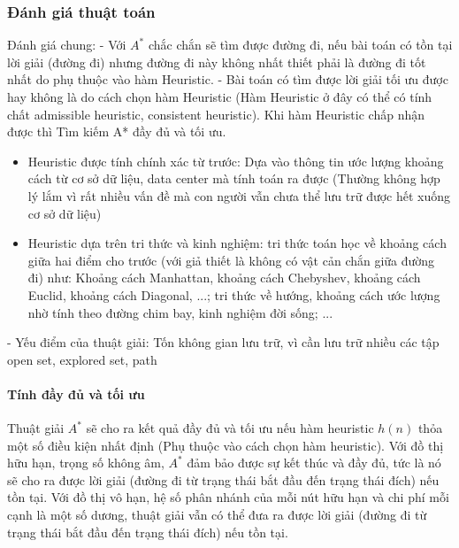 \documentclass{article}
\begin{document}
\subsubsection{Đánh giá thuật toán}
Đánh giá chung:\newline
- Với $A^{*}$ chắc chắn sẽ tìm được đường đi, nếu bài toán có tồn tại lời giải (đường đi) nhưng đường đi này không nhất thiết phải là đường đi tốt nhất do phụ thuộc vào hàm Heuristic.\newline
- Bài toán có tìm được lời giải tối ưu được hay không là do cách chọn hàm Heuristic (Hàm Heuristic ở đây có thể có tính chất admissible heuristic, consistent heuristic). Khi hàm Heuristic chấp nhận được thì Tìm kiếm A* đầy đủ và tối ưu.\newline
\begin{itemize}
\item Heuristic được tính chính xác từ trước: Dựa vào thông tin ước lượng khoảng cách từ cơ sở dữ liệu, data center mà tính toán ra được (Thường không hợp lý lắm vì rất nhiều vấn đề mà con người vẫn chưa thể lưu trữ được hết xuống cơ sở dữ liệu)\newline
\item Heuristic dựa trên tri thức và kinh nghiệm: tri thức toán học về khoảng cách giữa hai điểm cho trước (với giả thiết là không có vật cản chắn giữa đường đi) như: Khoảng cách Manhattan, khoảng cách Chebyshev, khoảng cách Euclid, khoảng cách Diagonal, ...; tri thức về hướng, khoảng cách ước lượng nhờ tính theo đường chim bay, kinh nghiệm đời sống; ...\newline
\end{itemize}
- Yếu điểm của thuật giải: Tốn không gian lưu trữ, vì cần lưu trữ nhiều các tập open set, explored set, path

\paragraph{Tính đầy đủ và tối ưu}
Thuật giải $A^{*}$ sẽ cho ra kết quả đầy đủ và tối ưu nếu hàm heuristic $h(n)$ thỏa một số điều kiện nhất định (Phụ thuộc vào cách chọn hàm heuristic).\newline
Với đồ thị hữu hạn, trọng số không âm, $A^{*}$ đảm bảo được sự kết thúc và đầy đủ, tức là nó sẽ cho ra được lời giải (đường đi từ trạng thái bắt đầu đến trạng thái đích) nếu tồn tại.\newline
Với đồ thị vô hạn, hệ số phân nhánh của mỗi nút hữu hạn và chi phí mỗi cạnh là một số dương, thuật giải vẫn có thể đưa ra được lời giải (đường đi từ trạng thái bắt đầu đến trạng thái đích) nếu tồn tại.
\end{document}
